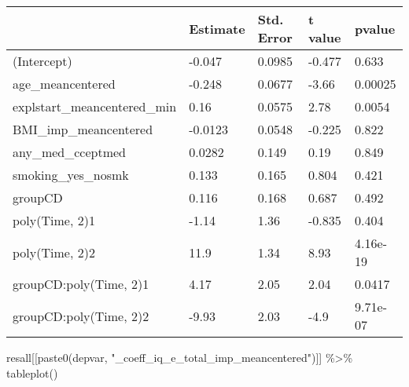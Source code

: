 \documentclass[
]{article}
\newenvironment{Shaded}{\begin{snugshade}}{\end{snugshade}}
\newcommand{\FunctionTok}[1]{\textcolor[rgb]{0.00,0.00,0.00}{#1}}
\newcommand{\NormalTok}[1]{#1}
\newcommand{\SpecialCharTok}[1]{\textcolor[rgb]{0.00,0.00,0.00}{#1}}
\newcommand{\StringTok}[1]{\textcolor[rgb]{0.31,0.60,0.02}{#1}}
\begin{document}
\begin{table}
\centering
\begin{tabular}[t]{l|l|l|l|l}
\hline
  & Estimate & Std. Error & t value & pvalue\\
\hline
(Intercept) & -0.047 & 0.0985 & -0.477 & 0.633\\
\hline
age\_meancentered & -0.248 & 0.0677 & -3.66 & 0.00025\\
\hline
explstart\_meancentered\_min & 0.16 & 0.0575 & 2.78 & 0.0054\\
\hline
BMI\_imp\_meancentered & -0.0123 & 0.0548 & -0.225 & 0.822\\
\hline
any\_med\_cceptmed & 0.0282 & 0.149 & 0.19 & 0.849\\
\hline
smoking\_yes\_nosmk & 0.133 & 0.165 & 0.804 & 0.421\\
\hline
groupCD & 0.116 & 0.168 & 0.687 & 0.492\\
\hline
poly(Time, 2)1 & -1.14 & 1.36 & -0.835 & 0.404\\
\hline
poly(Time, 2)2 & 11.9 & 1.34 & 8.93 & 4.16e-19\\
\hline
groupCD:poly(Time, 2)1 & 4.17 & 2.05 & 2.04 & 0.0417\\
\hline
groupCD:poly(Time, 2)2 & -9.93 & 2.03 & -4.9 & 9.71e-07\\
\hline
\end{tabular}
\end{table}

\begin{Shaded}
\begin{Highlighting}[]
\NormalTok{resall[[}\FunctionTok{paste0}\NormalTok{(depvar, }\StringTok{"\_coeff\_iq\_e\_total\_imp\_meancentered"}\NormalTok{)]] }\SpecialCharTok{\%\textgreater{}\%} \FunctionTok{tableplot}\NormalTok{()}
\end{Highlighting}
\end{Shaded}
\end{document}
